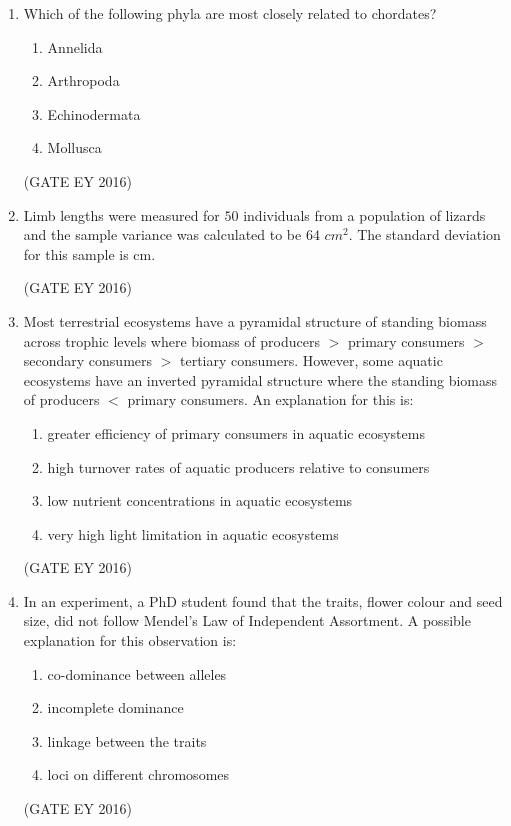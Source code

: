 \documentclass[journal]{IEEEtran}
\begin{document}
\begin{enumerate}[label=Q.\arabic*.]
\item Which of the following phyla are most closely related to chordates?
\begin{multicols}{4}
\begin{enumerate}
    \item Annelida
    \item Arthropoda
    \item Echinodermata
    \item Mollusca
\end{enumerate}
\end{multicols}
\hfill{(GATE EY 2016)}

\item Limb lengths were measured for $50$ individuals from a population of lizards and the sample variance was calculated to be $64$ $cm^{2}$. The standard deviation for this sample is \underline{\hspace{3cm}} cm.

\hfill{(GATE EY 2016)}

\item Most terrestrial ecosystems have a pyramidal structure of standing biomass across trophic levels where biomass of producers $>$ primary consumers $>$ secondary consumers $>$ tertiary consumers. However, some aquatic ecosystems have an inverted pyramidal structure where the standing biomass of producers $<$ primary consumers. An explanation for this is:
\begin{enumerate}
    \item greater efficiency of primary consumers in aquatic ecosystems
    \item high turnover rates of aquatic producers relative to consumers
    \item low nutrient concentrations in aquatic ecosystems
    \item very high light limitation in aquatic ecosystems
\end{enumerate}
\hfill{(GATE EY 2016)}

\item In an experiment, a PhD student found that the traits, flower colour and seed size, did not follow Mendel's Law of Independent Assortment. A possible explanation for this observation is:
\begin{multicols}{2}
\begin{enumerate}
    \item co-dominance between alleles
    \item incomplete dominance
    \item linkage between the traits
    \item loci on different chromosomes
\end{enumerate}
\end{multicols}
\hfill{(GATE EY 2016)}


\end{enumerate}
\end{document}
